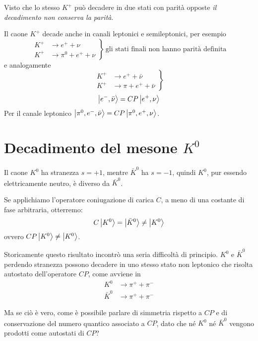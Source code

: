 Visto che lo stesso $K^+$ può decadere in due stati con parità opposte
\textit{il decadimento non conserva la parità}.

Il caone $K^+$ decade anche in canali leptonici e semileptonici, per esempio
\begin{equation}
  \left.
  \begin{split}
	K^+ &\rightarrow e^+ + \nu\\
	K^+ &\rightarrow \pi^0 + e^+ + \nu
  \end{split}
  \right\rbrace\,\text{gli stati finali non hanno parità definita}
\end{equation}
e analogamente
\begin{equation}
  \left.
  \begin{split}
	K^+ &\rightarrow e^+ + \bar{\nu}\\
  K^+ &\rightarrow \pi + e^+ + \bar{\nu}
  \end{split}
  \right\rbrace
\end{equation}
\[
  \Ket{e^-,\bar{\nu}} = CP\Ket{e^+,\nu}
\]
Per il canale leptonico $\Ket{\pi^0,e^-,\bar{\nu}}=CP\Ket{\pi^0,e^+,\nu}$.

\section[Decadimento del caone zero]{Decadimento del mesone $K^0$}
Il caone $K^0$ ha stranezza $s = +1$, mentre $\bar{K}^0$ ha $s =-1$, quindi
$K^0$, pur essendo elettricamente neutro, è diverso da $\bar{K}^0$.

Se applichiamo l'operatore coniugazione di carica $C$, a meno di una costante di
fase arbitraria, otterremo:
\begin{equation}
  C\Ket{K^0} = \Ket{\bar{K}^0} \neq \Ket{K^0}
\end{equation}
ovvero $CP\Ket{K^0} \neq \Ket{K^0}$.

Storicamente questo risultato incontrò una seria difficoltà di principio. $K^0$
e $\bar{K}^0$ perdendo stranezza possono decadere in uno stesso stato non
leptonico che risolta autostato dell'operatore $CP$, come avviene in 
\begin{align*}
  K^0       &\rightarrow \pi^+ + \pi^-\\
  \bar{K}^0 &\rightarrow \pi^+ + \pi^-
\end{align*}

Ma se ciò è vero, come è possibile parlare di simmetria rispetto a $CP$ e di
conservazione del numero quantico associato a $CP$, dato che n\'e $K^0$ n\'e
$\bar{K}^0$ vengono prodotti come autostati di $CP$?

